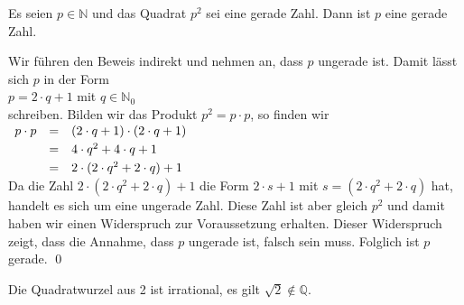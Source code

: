 \begin{Lemma} \label{lemma:b1}
  Es seien $p \in \mathbb{N}$ und das Quadrat $p^2$ sei eine gerade Zahl.
  Dann ist $p$ eine gerade Zahl.
\end{Lemma}

\proof
Wir f\"{u}hren den Beweis indirekt und nehmen an, dass $p$ ungerade ist.  Damit l\"{a}sst sich $p$  in der Form
\\[0.2cm]
\hspace*{1.3cm}
$p = 2 \cdot q + 1$ \quad mit \quad $q \in \mathbb{N}_0$
\\[0.2cm]
schreiben.  Bilden wir das Produkt $p^2 = p \cdot p$, so finden wir
\\[0.2cm]
\hspace*{1.3cm}
$
\begin{array}[t]{rcl}
  p \cdot p & = & (2 \cdot q + 1) \cdot (2 \cdot q + 1) \\[0.1cm]
            & = & 4 \cdot q^2 + 4 \cdot q + 1           \\[0.1cm]
            & = & 2 \cdot (2 \cdot q^2 + 2 \cdot q) + 1 
\end{array}
$
\\[0.2cm]
Da die Zahl $2 \cdot (2 \cdot q^2 + 2 \cdot q) + 1$ die Form $2 \cdot s + 1$ mit
$s = (2 \cdot q^2 + 2 \cdot q)$ hat, handelt es sich um eine ungerade Zahl.
Diese Zahl ist aber gleich $p^2$ und damit haben wir einen Widerspruch zur
Voraussetzung erhalten.  Dieser Widerspruch zeigt, dass die Annahme, dass $p$ ungerade ist, falsch
sein muss.  Folglich ist $p$ gerade.
\qed

\begin{Satz}
  Die Quadratwurzel aus 2 ist irrational, es gilt $\sqrt{2} \not\in \mathbb{Q}$.
\end{Satz}

